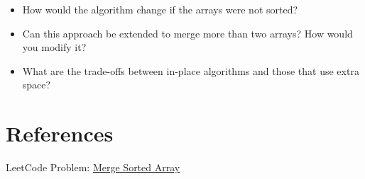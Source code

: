 \begin{itemize}
    \item How would the algorithm change if the arrays were not sorted?
    \item Can this approach be extended to merge more than two arrays? How would you modify it?
    \item What are the trade-offs between in-place algorithms and those that use extra space?
\end{itemize}

\section*{References}

LeetCode Problem: \href{https://leetcode.com/problems/merge-sorted-array/}{Merge Sorted Array}